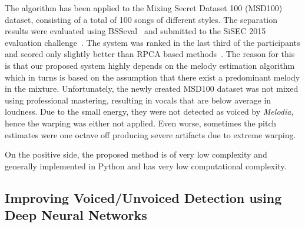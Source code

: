 The algorithm has been applied to the Mixing Secret Dataset 100 (MSD100) dataset,  consisting of a total of 100 songs of different styles.
The separation results were evaluated using BSSeval~\cite{fevotte05} and submitted to the SiSEC 2015 evaluation challenge~\cite{ono15}.
The system was ranked in the last third of the participants and scored only slightly better than RPCA based methods~\cite{huang12}.
The reason for this is that our proposed system highly depends on the melody estimation algorithm which in turns is based on the assumption that there exist a predominant melody in the mixture.
Unfortunately, the newly created MSD100 dataset was not mixed using professional mastering, resulting in vocals that are below average in loudness.
Due to the small energy, they were not detected as voiced by \emph{Melodia}, hence the warping was either not applied. Even worse, sometimes the pitch estimates were one octave off producing severe artifacts due to extreme warping.\par
On the positive side, the proposed method is of very low complexity and generally implemented in Python and has very low computational complexity.

\subsection{Improving Voiced/Unvoiced Detection using Deep Neural Networks}

